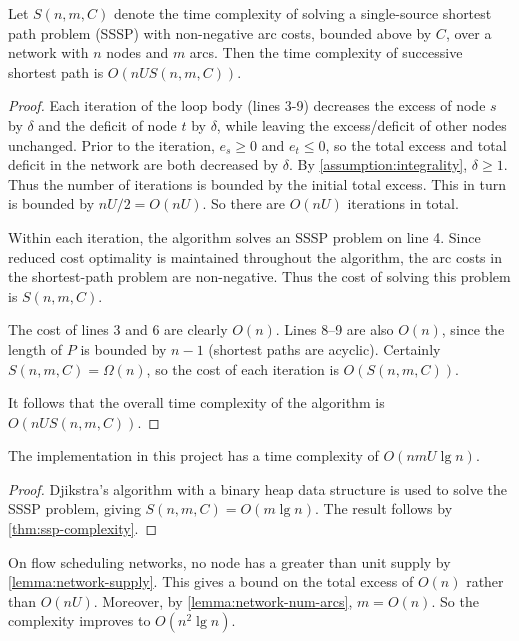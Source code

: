 \begin{thm} \label{thm:ssp-complexity}
Let $S(n,m,C)$ denote the time complexity of solving a single-source shortest path problem (SSSP) with non-negative arc costs, bounded above by $C$, over a network with $n$ nodes and $m$ arcs. Then the time complexity of successive shortest path is $O(nUS(n,m,C))$.
\end{thm}
\begin{proof}
Each iteration of the loop body (lines 3-9) decreases the excess of node $s$ by $\delta$ and the deficit of node $t$ by $\delta$, while leaving the excess/deficit of other nodes unchanged. Prior to the iteration, $e_s \geq 0$ and $e_t \leq 0$, so the total excess and total deficit in the network are both decreased by $\delta$. By \cref{assumption:integrality}, $\delta \geq 1$. Thus the number of iterations is bounded by the initial total excess. This in turn is bounded by $nU/2 = O(nU)$. So there are $O(nU)$ iterations in total.

Within each iteration, the algorithm solves an SSSP problem on line 4. Since reduced cost optimality is maintained throughout the algorithm, the arc costs in the shortest-path problem are non-negative\footnotemark. Thus the cost of solving this problem is $S(n,m,C)$.

The cost of lines 3 and 6 are clearly $O(n)$. Lines 8--9 are also $O(n)$, since the length of $P$ is bounded by $n-1$ (shortest paths are acyclic). Certainly $S(n,m,C) = \Omega(n)$, so the cost of each iteration is $O(S(n,m,C))$.

It follows that the overall time complexity of the algorithm is $O(nUS(n,m,C))$.
\end{proof}

\begin{cor}
The implementation in this project has a time complexity of $O(nmU \lg n)$.
\end{cor}
\begin{proof}
Djikstra's algorithm with a binary heap data structure is used to solve the SSSP problem, giving $S(n,m,C) = O(m \lg n)$. The result follows by \cref{thm:ssp-complexity}.
\end{proof}

\begin{remark}
On flow scheduling networks, no node has a greater than unit supply by \cref{lemma:network-supply}. This gives a bound on the total excess of $O(n)$ rather than $O(nU)$. Moreover, by \cref{lemma:network-num-arcs}, $m = O(n)$. So the complexity improves to $O(n^2 \lg n)$.
\end{remark}

